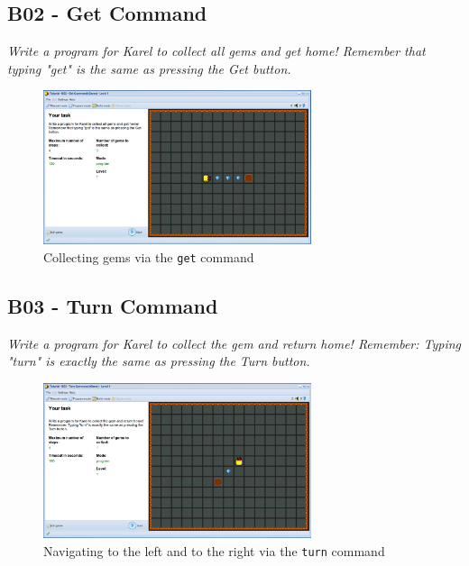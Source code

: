 \documentclass[article,A4,12pt]{llncs}
\begin{document}
\newpage
\subsection{B02 - Get Command}

{\em Write a program for Karel to collect all gems and get home! 
Remember that typing "get" is the same as pressing the Get button.}\\[-7mm]

\begin{figure}[!ht]
\begin{center}
\includegraphics[width=0.7\textwidth]{img/b02.png}
\end{center}
\vspace{-4mm}
\caption{Collecting gems via the {\tt get} command}
\label{fig:b02}
\vspace{-4mm}
\end{figure}
\noindent

\subsection{B03 - Turn Command}

{\em Write a program for Karel to collect the gem and return 
home! Remember: Typing "turn" is exactly the same as pressing 
the Turn button.}\\[-7mm]

\begin{figure}[!ht]
\begin{center}
\includegraphics[width=0.7\textwidth]{img/b03.png}
\end{center}
\vspace{-4mm}
\caption{Navigating to the left and to the right via the {\tt turn} command}
\label{fig:b03}
\vspace{-4mm}
\end{figure}
\noindent
\newpage
\end{document}
